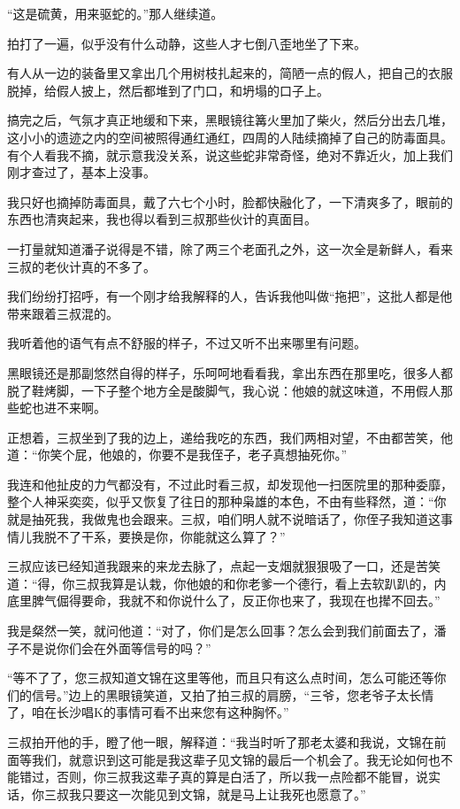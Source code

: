 “这是硫黄，用来驱蛇的。”那人继续道。

拍打了一遍，似乎没有什么动静，这些人才七倒八歪地坐了下来。

有人从一边的装备里又拿出几个用树枝扎起来的，简陋一点的假人，把自己的衣服脱掉，给假人披上，然后都堆到了门口，和坍塌的口子上。

搞完之后，气氛才真正地缓和下来，黑眼镜往篝火里加了柴火，然后分出去几堆，这小小的遗迹之内的空间被照得通红通红，四周的人陆续摘掉了自己的防毒面具。有个人看我不摘，就示意我没关系，说这些蛇非常奇怪，绝对不靠近火，加上我们刚才查过了，基本上没事。

我只好也摘掉防毒面具，戴了六七个小时，脸都快融化了，一下清爽多了，眼前的东西也清爽起来，我也得以看到三叔那些伙计的真面目。

一打量就知道潘子说得是不错，除了两三个老面孔之外，这一次全是新鲜人，看来三叔的老伙计真的不多了。

我们纷纷打招呼，有一个刚才给我解释的人，告诉我他叫做“拖把”，这批人都是他带来跟着三叔混的。

我听着他的语气有点不舒服的样子，不过又听不出来哪里有问题。

黑眼镜还是那副悠然自得的样子，乐呵呵地看看我，拿出东西在那里吃，很多人都脱了鞋烤脚，一下子整个地方全是酸脚气，我心说：他娘的就这味道，不用假人那些蛇也进不来啊。

正想着，三叔坐到了我的边上，递给我吃的东西，我们两相对望，不由都苦笑，他道：“你笑个屁，他娘的，你要不是我侄子，老子真想抽死你。”

我连和他扯皮的力气都没有，不过此时看三叔，却发现他一扫医院里的那种委靡，整个人神采奕奕，似乎又恢复了往日的那种枭雄的本色，不由有些释然，道：“你就是抽死我，我做鬼也会跟来。三叔，咱们明人就不说暗话了，你侄子我知道这事情儿我脱不了干系，要换是你，你能就这么算了？”

三叔应该已经知道我跟来的来龙去脉了，点起一支烟就狠狠吸了一口，还是苦笑道：“得，你三叔我算是认栽，你他娘的和你老爹一个德行，看上去软趴趴的，内底里脾气倔得要命，我就不和你说什么了，反正你也来了，我现在也撵不回去。”

我是粲然一笑，就问他道：“对了，你们是怎么回事？怎么会到我们前面去了，潘子不是说你们会在外面等信号的吗？”

“等不了了，您三叔知道文锦在这里等他，而且只有这么点时间，怎么可能还等你们的信号。”边上的黑眼镜笑道，又拍了拍三叔的肩膀，“三爷，您老爷子太长情了，咱在长沙唱K的事情可看不出来您有这种胸怀。”

三叔拍开他的手，瞪了他一眼，解释道：“我当时听了那老太婆和我说，文锦在前面等我们，就意识到这可能是我这辈子见文锦的最后一个机会了。我无论如何也不能错过，否则，你三叔我这辈子真的算是白活了，所以我一点险都不能冒，说实话，你三叔我只要这一次能见到文锦，就是马上让我死也愿意了。”

